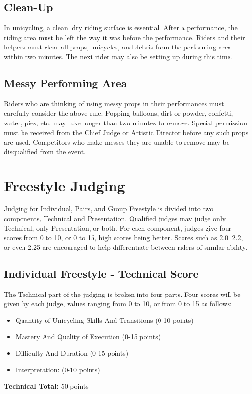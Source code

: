 \section{Clean-Up}
In unicycling, a clean, dry riding surface is essential.
After a performance, the riding area must be left the way it was before the performance.
Riders and their helpers must clear all props, unicycles, and debris from the performing area within two minutes.
The next rider may also be setting up during this time.

\section{Messy Performing Area}
Riders who are thinking of using messy props in their performances must carefully consider the above rule.
Popping balloons, dirt or powder, confetti, water, pies, etc.
may take longer than two minutes to remove.
Special permission must be received from the Chief Judge or Artistic Director before any such props are used.
Competitors who make messes they are unable to remove may be disqualified from the event.

\chapter{Freestyle Judging}

Judging for Individual, Pairs, and Group Freestyle is divided into two components, Technical and Presentation.
Qualified judges may judge only Technical, only Presentation, or both.
For each component, judges give four scores from 0 to 10, or 0 to 15, high scores being better.
Scores such as 2.0, 2.2, or even 2.25 are encouraged to help differentiate between riders of similar ability.

\section{Individual Freestyle - Technical Score \label{sec:freestyle_individual-technical-score}}
The Technical part of the judging is broken into four parts.
Four scores will be given by each judge, values ranging from 0 to 10, or from 0 to 15 as follows: 
\begin{itemize}
\item Quantity of Unicycling Skills And Transitions (0-10 points) 
\item Mastery And Quality of Execution (0-15 points) 
\item Difficulty And Duration (0-15 points) 
\item Interpretation: (0-10 points)
\end{itemize}
\textbf{Technical Total:} 50 points

